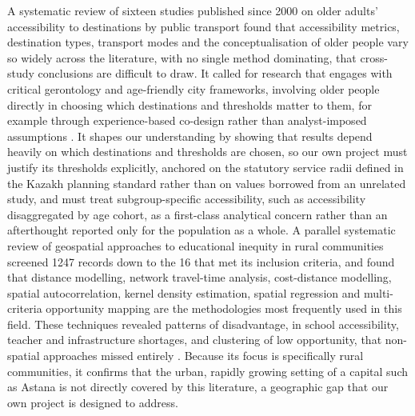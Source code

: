 \documentclass[journal]{IEEEtran}
\begin{document}
A systematic review of sixteen studies published since 2000 on older adults' accessibility to destinations by public transport found that accessibility metrics, destination types, transport modes and the conceptualisation of older people vary so widely across the literature, with no single method dominating, that cross-study conclusions are difficult to draw. It called for research that engages with critical gerontology and age-friendly city frameworks, involving older people directly in choosing which destinations and thresholds matter to them, for example through experience-based co-design rather than analyst-imposed assumptions \cite{ravensbergen2022}. It shapes our understanding by showing that results depend heavily on which destinations and thresholds are chosen, so our own project must justify its thresholds explicitly, anchored on the statutory service radii defined in the Kazakh planning standard rather than on values borrowed from an unrelated study, and must treat subgroup-specific accessibility, such as accessibility disaggregated by age cohort, as a first-class analytical concern rather than an afterthought reported only for the population as a whole. A parallel systematic review of geospatial approaches to educational inequity in rural communities screened 1247 records down to the 16 that met its inclusion criteria, and found that distance modelling, network travel-time analysis, cost-distance modelling, spatial autocorrelation, kernel density estimation, spatial regression and multi-criteria opportunity mapping are the methodologies most frequently used in this field. These techniques revealed patterns of disadvantage, in school accessibility, teacher and infrastructure shortages, and clustering of low opportunity, that non-spatial approaches missed entirely \cite{rwandashi2026}. Because its focus is specifically rural communities, it confirms that the urban, rapidly growing setting of a capital such as Astana is not directly covered by this literature, a geographic gap that our own project is designed to address.
\end{document}
